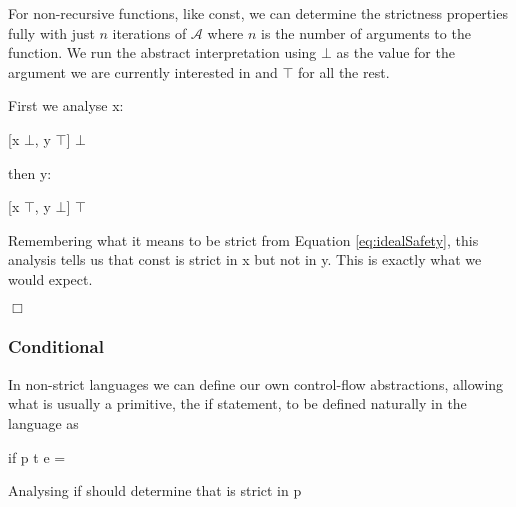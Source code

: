 For non-recursive functions, like \<const\>, we can determine the strictness
properties fully with just $n$ iterations of $\mathcal{A}$ where $n$ is the
number of arguments to the function. We run the abstract interpretation using
$\bot$ as the value for the argument we are currently interested in and $\top$
for all the rest.

First we analyse \<x\>:
\begin{haskell*}
[x \mapsto \(\bot\), y \mapsto \(\top\)] \Rightarrow \(\bot\)
\end{haskell*}

then \<y\>:
\begin{haskell*}
[x \mapsto \(\top\), y \mapsto \(\bot\)] \Rightarrow \(\top\)
\end{haskell*}

Remembering what it means to be strict from Equation \ref{eq:idealSafety}, this
analysis tells us that \<const\> is strict in \<x\> but not in \<y\>. This is
exactly what we would expect.

\hfill$\Box$

\subsubsection{Conditional}

In non-strict languages we can define our own control-flow abstractions,
allowing what is usually a primitive, the \<if\> statement, to be defined
naturally in the language as

\begin{haskell*}
if p t e = 
\end{haskell*}

Analysing \<if\> should determine that is strict in \<p\>

\begin{haskell*}
 \hasphi
{}
\end{haskell*}

